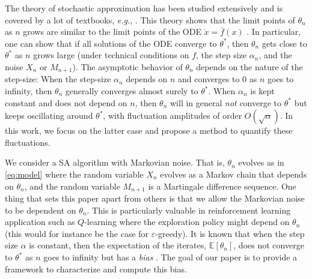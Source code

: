 \documentclass{article}
\newcommand\E{\mathbb{E}}
\newcommand\esp[1]{\E\left[#1\right]}
\newcommand\barf{\bar{f}}
\begin{document}
The theory of stochastic approximation has been studied extensively and is covered by a lot of textbooks, \emph{e.g.}, \cite{benveniste2012adaptive,borkar2009stochastic,kushner2003stochastic}. This theory shows that the limit points of $\theta_n$ as $n$ grows are similar to the limit points of the ODE $\dot{x}=\barf(x)$ \cite{benaim2006dynamics,borkar2000ode}.  In particular, one can show that if all solutions of the ODE converge to $\theta^*$, then $\theta_n$ gets close to $\theta^*$ as $n$ grows large (under technical conditions on $f$, the step size $\alpha_n$, and the noise $X_n$ or $M_{n+1}$). The asymptotic behavior of $\theta_n$ depends on the nature of the step-size: When the step-size $\alpha_n$ depends on $n$ and converges to $0$ as $n$ goes to infinity, then $\theta_n$ generally converges almost surely to $\theta^*$. When $\alpha_n$ is kept constant and does not depend on $n$, then $\theta_n$ will in general \textit{not} converge to $\theta^*$ but keeps oscillating around $\theta^*$, with fluctuation amplitudes of order $O(\sqrt{\alpha})$. In this work, we focus on the latter case and propose a method to quantify these fluctuations.

We consider a SA algorithm with Markovian noise. That is, $\theta_n$ evolves as in \eqref{eq:model} where the random variable $X_n$ evolves as a Markov chain that depends on $\theta_n$, and the random variable $M_{n+1}$ is a Martingale difference sequence. One thing that sets this paper apart from others is that we allow the Markovian noise to be dependent on $\theta_n$.  This is particularly valuable in reinforcement learning application such as $Q$-learning where the exploration policy might depend on $\theta_n$ (this would for instance be the case for $\varepsilon$-greedy). It is known that when the step size $\alpha$ is constant, then the expectation of the iterates, $\esp{\theta_n}$, does not converge to $\theta^*$ as $n$ goes to infinity but has a \emph{bias} \cite{yu2021analysis,huo2023bias}. The goal of our paper is to provide a framework to characterize and compute this bias.
\end{document}
